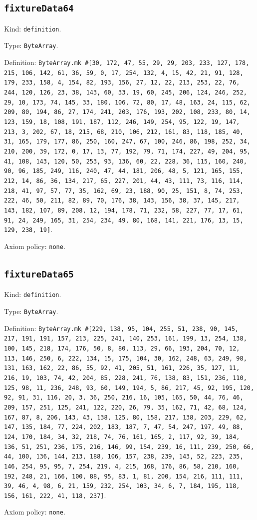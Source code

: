 \documentclass[11pt]{article}
\begin{document}
\subsection*{\texttt{fixtureData64}}
\noindent Kind: \texttt{definition}.\par
\noindent Type: \texttt{ByteArray}.\par
\noindent Definition: \texttt{ByteArray.mk \#[30, 172, 47, 55, 29, 29, 203, 233, 127, 178, 215, 106, 142, 61, 36, 59, 0, 17, 254, 132, 4, 15, 42, 21, 91, 128, 179, 233, 158, 4, 154, 82, 193, 156, 27, 12, 22, 213, 253, 22, 76, 244, 120, 126, 23, 38, 143, 60, 33, 19, 60, 245, 206, 124, 246, 252, 29, 10, 173, 74, 145, 33, 180, 106, 72, 80, 17, 48, 163, 24, 115, 62, 209, 80, 194, 86, 27, 174, 241, 203, 176, 193, 202, 108, 233, 80, 14, 123, 159, 18, 108, 191, 187, 112, 246, 149, 254, 95, 122, 19, 147, 213, 3, 202, 67, 18, 215, 68, 210, 106, 212, 161, 83, 118, 185, 40, 31, 165, 179, 177, 86, 250, 160, 247, 67, 100, 246, 86, 198, 252, 34, 210, 200, 39, 172, 0, 17, 13, 77, 192, 79, 71, 174, 227, 49, 204, 95, 41, 108, 143, 120, 50, 253, 93, 136, 60, 22, 228, 36, 115, 160, 240, 90, 96, 185, 249, 116, 240, 47, 44, 181, 206, 48, 5, 121, 165, 155, 212, 14, 86, 36, 134, 217, 65, 227, 201, 44, 43, 111, 73, 116, 114, 218, 41, 97, 57, 77, 35, 162, 69, 23, 188, 90, 25, 151, 8, 74, 253, 222, 46, 50, 211, 82, 89, 70, 176, 38, 143, 156, 38, 37, 145, 217, 143, 182, 107, 89, 208, 12, 194, 178, 71, 232, 58, 227, 77, 17, 61, 91, 24, 249, 165, 31, 254, 234, 49, 80, 168, 141, 221, 176, 13, 15, 129, 238, 19]}.\par
\noindent Axiom policy: \texttt{none}.\par
\subsection*{\texttt{fixtureData65}}
\noindent Kind: \texttt{definition}.\par
\noindent Type: \texttt{ByteArray}.\par
\noindent Definition: \texttt{ByteArray.mk \#[229, 138, 95, 104, 255, 51, 238, 90, 145, 217, 191, 191, 157, 213, 225, 241, 140, 253, 161, 199, 13, 254, 138, 100, 145, 218, 174, 176, 50, 8, 80, 113, 29, 66, 193, 204, 70, 12, 113, 146, 250, 6, 222, 134, 15, 175, 104, 30, 162, 248, 63, 249, 98, 131, 163, 162, 22, 86, 55, 92, 41, 205, 51, 161, 226, 35, 127, 11, 216, 19, 103, 74, 42, 204, 85, 228, 241, 76, 138, 83, 151, 236, 110, 125, 98, 11, 236, 248, 93, 60, 149, 194, 5, 86, 217, 45, 92, 195, 120, 92, 91, 31, 116, 20, 3, 36, 250, 216, 16, 105, 165, 50, 44, 76, 46, 209, 157, 251, 125, 241, 122, 220, 26, 79, 35, 162, 71, 42, 68, 124, 167, 87, 8, 206, 143, 43, 138, 125, 80, 158, 217, 138, 203, 229, 62, 147, 135, 184, 77, 224, 202, 183, 187, 7, 47, 54, 247, 197, 49, 88, 124, 170, 184, 34, 32, 218, 74, 76, 161, 165, 2, 117, 92, 39, 184, 136, 51, 251, 236, 175, 216, 146, 99, 154, 239, 16, 111, 239, 250, 66, 44, 100, 136, 144, 213, 188, 106, 157, 238, 239, 143, 52, 223, 235, 146, 254, 95, 95, 7, 254, 219, 4, 215, 168, 176, 86, 58, 210, 160, 192, 248, 21, 166, 100, 88, 95, 83, 1, 81, 200, 154, 216, 111, 111, 39, 46, 4, 98, 6, 21, 159, 232, 254, 103, 34, 6, 7, 184, 195, 118, 156, 161, 222, 41, 118, 237]}.\par
\noindent Axiom policy: \texttt{none}.\par
\end{document}
